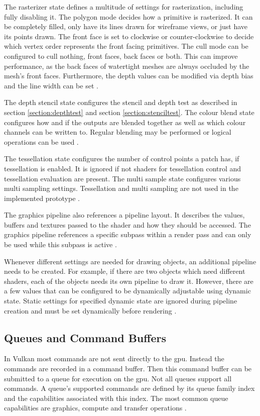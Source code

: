 The rasterizer state defines a multitude of settings for rasterization, including fully disabling it. The polygon mode decides how a primitive is rasterized. It can be completely filled, only have its lines drawn for wireframe views, or just have its points drawn. The front face is set to clockwise or counter-clockwise to decide which vertex order represents the front facing primitives. The cull mode can be configured to cull nothing, front faces, back faces or both. This can improve performance, as the back faces of watertight meshes are always occluded by the mesh's front faces.  Furthermore, the depth values can be modified via depth bias and the line width can be set \cite{khronos:vulkan:spec1.1}.

The depth stencil state configures the stencil and depth test as described in section \ref{section:depthtest} and section \ref{section:stenciltest}. The colour blend state configures how and if the outputs are blended together as well as which colour channels can be written to. Regular blending may be performed or logical operations can be used \cite{khronos:vulkan:spec1.1}.

The tessellation state configures the number of control points a patch has, if tessellation is enabled. It is ignored if not shaders for tessellation control and tessellation evaluation are present. The multi sample state configures various multi sampling settings. Tessellation and multi sampling are not used in the implemented prototype \cite{khronos:vulkan:spec1.1}.

The graphics pipeline also references a pipeline layout. It describes the values, buffers and textures passed to the shader and how they should be accessed. The graphics pipeline references a specific subpass within a render pass and can only be used while this subpass is active \cite{khronos:vulkan:spec1.1}.

Whenever different settings are needed for drawing objects, an additional pipeline needs to be created. For example, if there are two objects which need different shaders, each of the objects needs its own pipeline to draw it. However, there are a few values that can be configured to be dynamically adjustable using dynamic state. Static settings for specified dynamic state are ignored during pipeline creation and must be set dynamically before rendering \cite{khronos:vulkan:spec1.1}.

\subsection{Queues and Command Buffers}
In Vulkan most commands are not sent directly to the \gls{gpu}. Instead the commands are recorded in a command buffer. Then this command buffer can be submitted to a queue for execution on the \gls{gpu}. Not all queues support all commands. A queue's supported commands are defined by its queue family index and the capabilities associated with this index. The most common queue capabilities are graphics, compute and transfer operations \cite{khronos:vulkan:spec1.1}.

